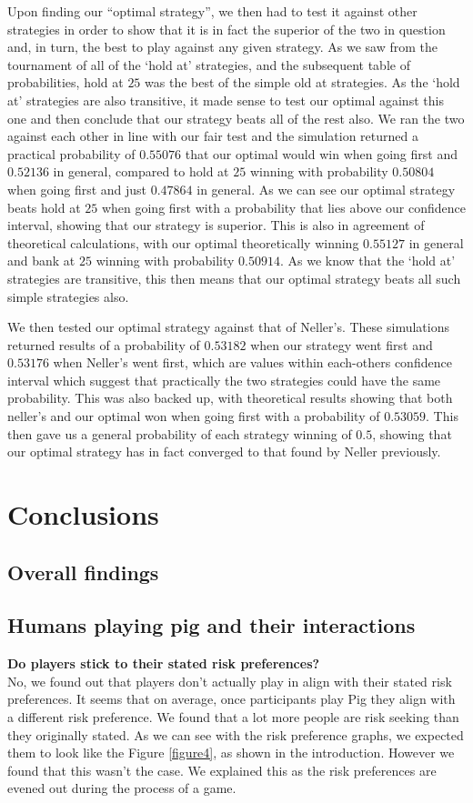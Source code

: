 \documentclass[a4paper,titlepage]{article}
\begin{document}
Upon finding our ``optimal strategy'', we then had to test it against other strategies in order to show that it is in fact the superior of the two in question and, in turn, the best to play against any given strategy. As we saw from the tournament of all of the ‘hold at’ strategies, and the subsequent table of probabilities, hold at $25$ was the best of the simple old at strategies. As the ‘hold at’ strategies are also transitive, it made sense to test our optimal against this one and then conclude that our strategy beats all of the rest also. We ran the two against each other in line with our fair test and the simulation returned a practical probability of $0.55076$ that our optimal would win when going first and $0.52136$ in general, compared to hold at $25$ winning with probability $0.50804$ when going first and just $0.47864$ in general. As we can see our optimal strategy beats hold at $25$ when going first with a probability that lies above our confidence interval, showing that our strategy is superior. This is also in agreement of theoretical calculations, with our optimal theoretically winning $0.55127$ in general and bank at $25$ winning with probability $0.50914$. As we know that the ‘hold at’ strategies are transitive, this then means that our optimal strategy beats all such simple strategies also.

We then tested our optimal strategy against that of Neller’s. These simulations returned results of a probability of $0.53182$ when our strategy went first and $0.53176$ when Neller’s went first, which are values within each-others confidence interval which suggest that practically the two strategies could have the same probability. This was also backed up, with theoretical results showing that both neller’s and our optimal won when going first with a probability of $0.53059$. This then gave us a general probability of each strategy winning of $0.5$, showing that our optimal strategy has in fact converged to that found by Neller previously.

\section{Conclusions}
\subsection{Overall findings}
\subsection{Humans playing pig and their interactions}
\textbf{Do players stick to their stated risk preferences?}\\No, we found out that players don’t actually play in align with their stated risk preferences. It seems that on average, once participants play Pig they align with a different risk preference. We found that a lot more people are risk seeking than they originally stated. As we can see with the risk preference graphs, we expected them to look like the Figure \ref{figure4}, as shown in the introduction. However we found that this wasn’t the case. We explained this as the risk preferences are evened out during the process of a game.
\end{document}
